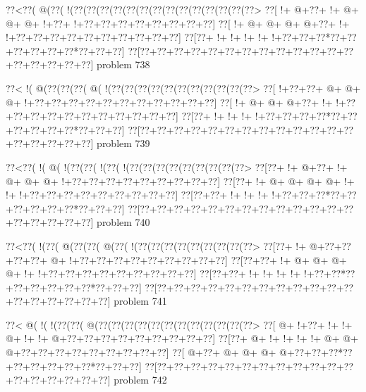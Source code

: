 \vbox{\vbox{\goo
\0??<\0??(\- @(\0??(\- !(\0??(\0??(\0??(\0??(\0??(\0??(\0??(\0??(\0??(\0??(\0??(\0??(\0??(\0??>
\0??[\- !+\- @+\0??+\- !+\- @+\- @+\- @+\- !+\0??+\- !+\0??+\0??+\0??+\0??+\0??+\0??+\0??+\0??]
\0??[\- !+\- @+\- @+\- @+\- @+\0??+\- !+\- !+\0??+\0??+\0??+\0??+\0??+\0??+\0??+\0??+\0??+\0??]
\0??[\0??+\- !+\- !+\- !+\- !+\- !+\0??+\0??+\0??*\0??+\0??+\0??+\0??+\0??+\0??*\0??+\0??+\0??]
\0??[\0??+\0??+\0??+\0??+\0??+\0??+\0??+\0??+\0??+\0??+\0??+\0??+\0??+\0??+\0??+\0??+\0??+\0??]
}
\hfil problem 738\hfil\break
}



\vbox{\vbox{\goo
\0??<\- !(\- @(\0??(\0??(\0??(\- @(\- !(\0??(\0??(\0??(\0??(\0??(\0??(\0??(\0??(\0??(\0??(\0??>
\0??[\- !+\0??+\0??+\- @+\- @+\- @+\- !+\0??+\0??+\0??+\0??+\0??+\0??+\0??+\0??+\0??+\0??+\0??]
\0??[\- !+\- @+\- @+\- @+\0??+\- !+\- !+\0??+\0??+\0??+\0??+\0??+\0??+\0??+\0??+\0??+\0??+\0??]
\0??[\0??+\- !+\- !+\- !+\- !+\0??+\0??+\0??+\0??*\0??+\0??+\0??+\0??+\0??+\0??*\0??+\0??+\0??]
\0??[\0??+\0??+\0??+\0??+\0??+\0??+\0??+\0??+\0??+\0??+\0??+\0??+\0??+\0??+\0??+\0??+\0??+\0??]
}
\hfil problem 739\hfil\break
}



\vbox{\vbox{\goo
\0??<\0??(\- !(\- @(\- !(\0??(\0??(\- !(\0??(\- !(\0??(\0??(\0??(\0??(\0??(\0??(\0??(\0??(\0??>
\0??[\0??+\- !+\- @+\0??+\- !+\- @+\- @+\- @+\- !+\0??+\0??+\0??+\0??+\0??+\0??+\0??+\0??+\0??]
\0??[\0??+\- !+\- @+\- @+\- @+\- @+\- !+\- !+\- !+\0??+\0??+\0??+\0??+\0??+\0??+\0??+\0??+\0??]
\0??[\0??+\0??+\- !+\- !+\- !+\- !+\0??+\0??+\0??*\0??+\0??+\0??+\0??+\0??+\0??*\0??+\0??+\0??]
\0??[\0??+\0??+\0??+\0??+\0??+\0??+\0??+\0??+\0??+\0??+\0??+\0??+\0??+\0??+\0??+\0??+\0??+\0??]
}
\hfil problem 740\hfil\break
}



\vbox{\vbox{\goo
\0??<\0??(\- !(\0??(\- @(\0??(\0??(\- @(\0??(\- !(\0??(\0??(\0??(\0??(\0??(\0??(\0??(\0??(\0??>
\0??[\0??+\- !+\- @+\0??+\0??+\0??+\0??+\- @+\- !+\0??+\0??+\0??+\0??+\0??+\0??+\0??+\0??+\0??]
\0??[\0??+\0??+\- !+\- @+\- @+\- @+\- @+\- !+\- !+\0??+\0??+\0??+\0??+\0??+\0??+\0??+\0??+\0??]
\0??[\0??+\0??+\- !+\- !+\- !+\- !+\- !+\0??+\0??*\0??+\0??+\0??+\0??+\0??+\0??*\0??+\0??+\0??]
\0??[\0??+\0??+\0??+\0??+\0??+\0??+\0??+\0??+\0??+\0??+\0??+\0??+\0??+\0??+\0??+\0??+\0??+\0??]
}
\hfil problem 741\hfil\break
}



\vbox{\vbox{\goo
\0??<\- @(\- !(\- !(\0??(\0??(\- @(\0??(\0??(\0??(\0??(\0??(\0??(\0??(\0??(\0??(\0??(\0??(\0??>
\0??[\- @+\- !+\0??+\- !+\- !+\- @+\- !+\- !+\- @+\0??+\0??+\0??+\0??+\0??+\0??+\0??+\0??+\0??]
\0??[\0??+\- @+\- !+\- !+\- !+\- !+\- @+\- @+\- @+\0??+\0??+\0??+\0??+\0??+\0??+\0??+\0??+\0??]
\0??[\- @+\0??+\- @+\- @+\- @+\- @+\0??+\0??+\0??*\0??+\0??+\0??+\0??+\0??+\0??*\0??+\0??+\0??]
\0??[\0??+\0??+\0??+\0??+\0??+\0??+\0??+\0??+\0??+\0??+\0??+\0??+\0??+\0??+\0??+\0??+\0??+\0??]
}
\hfil problem 742\hfil\break
}



